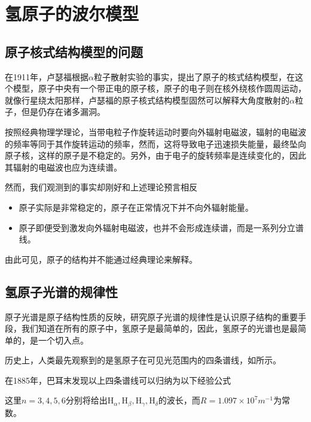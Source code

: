 \section{氢原子的波尔模型}

\subsection{原子核式结构模型的问题}
在1911年，卢瑟福根据$\alpha$粒子散射实验的事实，提出了原子的核式结构模型，在这个模型，原子中央有一个带正电的原子核，原子的电子则在核外绕核作圆周运动，就像行星绕太阳那样，卢瑟福的原子核式结构模型固然可以解释大角度散射的$\alpha$粒子，但是仍存在诸多漏洞。

按照经典物理学理论，当带电粒子作旋转运动时要向外辐射电磁波，辐射的电磁波的频率等同于其作旋转运动的频率，然而，这将导致电子迅速损失能量，最终坠向原子核，这样的原子是不稳定的。另外，由于电子的旋转频率是连续变化的，因此其辐射的电磁波也应为连续谱。

然而，我们观测到的事实却刚好和上述理论预言相反
\begin{itemize}
    \item 原子实际是非常稳定的，原子在正常情况下并不向外辐射能量。
    \item 原子即便受到激发向外辐射电磁波，也并不会形成连续谱，而是一系列分立谱线。
\end{itemize}
由此可见，原子的结构并不能通过经典理论来解释。

\subsection{氢原子光谱的规律性}
原子光谱是原子结构性质的反映，研究原子光谱的规律性是认识原子结构的重要手段，我们知道在所有的原子中，氢原子是最简单的，因此，氢原子的光谱也是最简单的，是一个切入点。

历史上，人类最先观察到的是氢原子在可见光范围内的四条谱线，如所示。

在1885年，巴耳末发现以上四条谱线可以归纳为以下经验公式
这里$n=3,4,5,6$分别将给出$\text{H}_{\alpha},\text{H}_{\beta},\text{H}_{\gamma},\text{H}_{\delta}$的波长，而$R=1.097\times 10^{7}\si{m^{-1}}$为常数。

